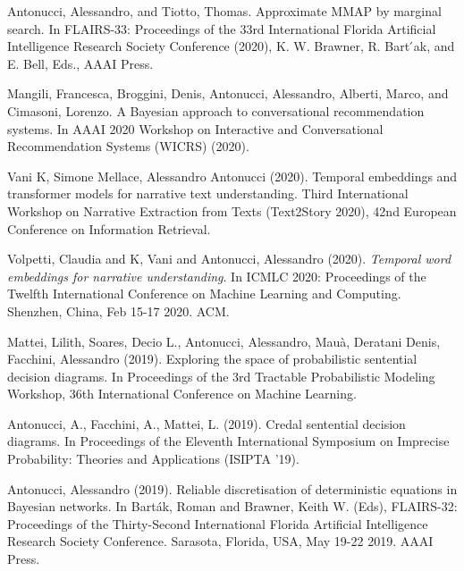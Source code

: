 \begin{cventries}

\begin{cvitems}
\item Antonucci, Alessandro, and Tiotto, Thomas. Approximate MMAP by marginal search. In FLAIRS-33: Proceedings of the 33rd International Florida Artificial Intelligence Research Society Conference (2020), K. W. Brawner, R. Bart ́ak, and E. Bell, Eds., AAAI Press.
\item Mangili, Francesca, Broggini, Denis, Antonucci, Alessandro, Alberti, Marco, and Cimasoni, Lorenzo. A Bayesian approach to conversational recommendation systems. In AAAI 2020 Workshop on Interactive and Conversational Recommendation Systems (WICRS) (2020).
\item Vani K, Simone Mellace, Alessandro Antonucci (2020). Temporal embeddings and transformer models for narrative text understanding. Third International Workshop on Narrative Extraction from Texts (Text2Story 2020), 42nd European Conference on Information Retrieval.
\item Volpetti, Claudia and K, Vani and Antonucci, Alessandro (2020). \emph{Temporal word embeddings for narrative understanding}. In ICMLC 2020: Proceedings of the Twelfth International Conference on Machine Learning and Computing.   Shenzhen, China,   Feb 15-17 2020.   ACM.
\item Mattei, Lilith, Soares, Decio L., Antonucci, Alessandro, Mauà, Deratani Denis, Facchini, Alessandro (2019). Exploring the space of probabilistic sentential decision diagrams. In Proceedings of the 3rd Tractable Probabilistic Modeling Workshop, 36th International Conference on Machine Learning.
\item Antonucci, A., Facchini, A., Mattei, L. (2019). Credal sentential decision diagrams. In Proceedings of the Eleventh International Symposium on Imprecise Probability: Theories and Applications (ISIPTA '19).
\item Antonucci, Alessandro (2019).   Reliable discretisation of deterministic equations in Bayesian networks.   In Barták, Roman and Brawner, Keith W. (Eds), FLAIRS-32: Proceedings of the Thirty-Second International Florida Artificial Intelligence Research Society Conference.   Sarasota, Florida, USA,   May 19-22 2019.   AAAI Press.

\end{cvitems}
\end{cventries}
